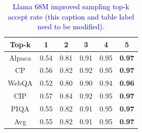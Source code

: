 \begin{table}
\begin{center}
\caption{\textcolor{blue}{Llama 68M improved sampling top-k accept rate (this caption and table label need to be modified).}}
\footnotesize
\label{tab:cbt-llama}
\begin{tabular}{cccccc}
\toprule
           Top-k     & 1 & 2 & 3 & 4 & 5 \\ \midrule
Alpaca     &0.54          & 0.81    & 0.91     & 0.95     & \textbf{0.97}     \\
CP         &0.56          & 0.82    & 0.92     & 0.95     & \textbf{0.97}     \\
WebQA      &0.52          & 0.80    & 0.90     & 0.94     & \textbf{0.96}     \\ 
CIP        &0.57          & 0.84    & 0.92     & 0.95     & \textbf{0.97}     \\
PIQA       &0.55          & 0.82    & 0.91     & 0.95     & \textbf{0.97}     \\   \midrule
Avg        &0.55          & 0.82    & 0.91     & 0.95     & \textbf{0.97}      \\ \bottomrule
\end{tabular}
\end{center}
\end{table}
\fi